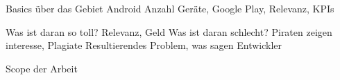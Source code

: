 Basics über das Gebiet Android
Anzahl Geräte, Google Play, Relevanz, KPIs

Was ist daran so toll?
Relevanz, Geld
Was ist daran schlecht?
Piraten zeigen interesse, Plagiate
Resultierendes Problem, was sagen Entwickler

Scope der Arbeit







%


%
